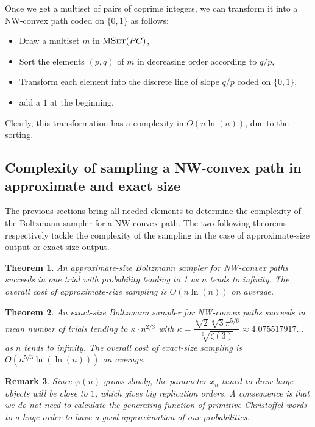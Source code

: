 \documentclass{article}
\DeclareMathOperator{\MSet}{\textsc{MSet}}
\newtheorem{theorem}{Theorem}[section]
\newtheorem{remark}[theorem]{Remark}
\begin{document}
Once we get a multiset of pairs of coprime integers, we can transform it into a NW-convex path coded on $\{0,1\}$ as follows:
\begin{itemize}
\item Draw a multiset $m$ in $\MSet(PC)$,
\item Sort the elements $(p,q)$ of $m$ in decreasing order according to $q/p$,
\item Transform each element into the discrete line of slope $q/p$ coded on $\{0,1\}$,
\item add a $1$ at the beginning.
\end{itemize}
Clearly, this transformation has a complexity in $O(n\ln(n))$, due to the sorting.

\subsection{Complexity of sampling a NW-convex path in approximate and exact size}

The previous sections bring all needed elements to determine the complexity of the Boltzmann sampler for a NW-convex path. 
The two following theorems respectively tackle the complexity of the sampling in the case of approximate-size output or exact size output.

\begin{theorem}
An approximate-size Boltzmann sampler for NW-convex paths succeeds in one trial with probability tending to 1 as $n$ tends to infinity. 
The overall cost of approximate-size sampling is $O(n\ln(n))$ on average.
\end{theorem}




\begin{theorem}
\label{theo3}
An exact-size Boltzmann sampler for NW-convex paths succeeds in mean number of trials tending to $\kappa\cdot n^{2/3}$
 with $\kappa={\dfrac {\sqrt [6]{2}\sqrt [3]{3}{\pi }^{5/6}}{\sqrt [6]{\zeta  \left(
3 \right) }}}\approx 4.075517917...$
as $n$ tends to infinity. The overall cost of exact-size sampling is $O(n^{5/3}\ln(\ln(n)))$ on average.
\end{theorem}

\begin{remark}
Since $\varphi(n)$ grows slowly, the parameter $x_n$ tuned to draw large objects will be close to $1$, which gives big replication orders.
A consequence
is that we do not need to calculate the generating function of primitive Christoffel words to a huge order to have a good approximation of our probabilities.
\end{remark}
\end{document}
